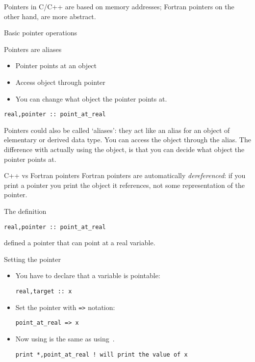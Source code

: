 
Pointers in C/C++ are based on memory addresses; 
Fortran pointers on the other hand, are more
abstract.

 {Basic pointer operations}

\begin{block}{Pointers are aliases}
  \label{sl:fpoint}
  \begin{itemize}
  \item Pointer points at an object
  \item Access object through pointer
  \item You can change what object the pointer points at.
  \end{itemize}
\begin{lstlisting}
real,pointer :: point_at_real
\end{lstlisting}
\end{block}

Pointers could also be called `aliases': they act like an alias for an
object of elementary or derived data type. You can access the object
through the alias. The difference with actually using the object, is
that you can decide what object the pointer points at.

\begin{block}{C++ vs Fortran pointers}
  \label{sl:cpoint-vs-fpoint}
  Fortran pointers are automatically
  \emph{dereferenced}: if you print a
  pointer you print the object it references, not some representation
  of the pointer.
\end{block}

The  definition
\begin{lstlisting}
real,pointer :: point_at_real
\end{lstlisting}
defined a pointer that can point at a real variable.

\begin{block}{Setting the pointer}
  \label{sl:fpoint-set}
  \begin{itemize}
  \item You have to declare that a variable is pointable:
\begin{lstlisting}
real,target :: x
\end{lstlisting}
\item Set the pointer with \verb+=>+ notation:
\begin{lstlisting}
point_at_real => x
\end{lstlisting}
\item Now using  is the same as using~.
\begin{lstlisting}
print *,point_at_real ! will print the value of x
\end{lstlisting}
  \end{itemize}
\end{block}

